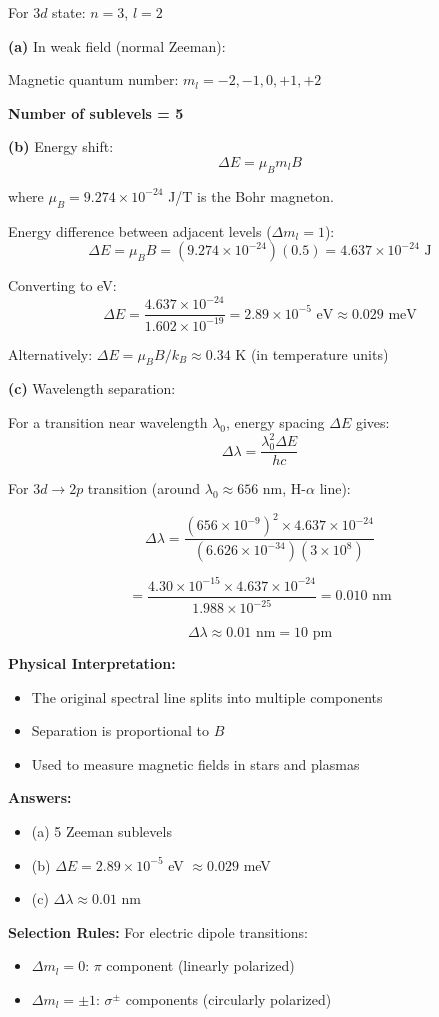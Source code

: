 \documentclass[12pt,a4paper]{article}
\begin{document}
\begin{solution}
For $3d$ state: $n = 3$, $l = 2$

\textbf{(a)} In weak field (normal Zeeman):

Magnetic quantum number: $m_l = -2, -1, 0, +1, +2$

\textbf{Number of sublevels = 5}

\textbf{(b)} Energy shift:
$$\Delta E = \mu_B m_l B$$

where $\mu_B = 9.274 \times 10^{-24}$ J/T is the Bohr magneton.

Energy difference between adjacent levels ($\Delta m_l = 1$):
$$\Delta E = \mu_B B = (9.274 \times 10^{-24})(0.5) = 4.637 \times 10^{-24}\text{ J}$$

Converting to eV:
$$\Delta E = \frac{4.637 \times 10^{-24}}{1.602 \times 10^{-19}} = 2.89 \times 10^{-5}\text{ eV} \approx 0.029\text{ meV}$$

Alternatively: $\Delta E = \mu_B B / k_B \approx 0.34$ K (in temperature units)

\textbf{(c)} Wavelength separation:

For a transition near wavelength $\lambda_0$, energy spacing $\Delta E$ gives:
$$\Delta\lambda = \frac{\lambda_0^2 \Delta E}{hc}$$

For $3d \to 2p$ transition (around $\lambda_0 \approx 656$ nm, H-$\alpha$ line):

$$\Delta\lambda = \frac{(656 \times 10^{-9})^2 \times 4.637 \times 10^{-24}}{(6.626 \times 10^{-34})(3 \times 10^8)}$$

$$= \frac{4.30 \times 10^{-15} \times 4.637 \times 10^{-24}}{1.988 \times 10^{-25}} = 0.010\text{ nm}$$

$$\Delta\lambda \approx 0.01\text{ nm} = 10\text{ pm}$$

\textbf{Physical Interpretation:}
\begin{itemize}
    \item The original spectral line splits into multiple components
    \item Separation is proportional to $B$
    \item Used to measure magnetic fields in stars and plasmas
\end{itemize}

\textbf{Answers:}
\begin{itemize}
    \item (a) 5 Zeeman sublevels
    \item (b) $\Delta E = 2.89 \times 10^{-5}$ eV $\approx 0.029$ meV
    \item (c) $\Delta\lambda \approx 0.01$ nm
\end{itemize}

\textbf{Selection Rules:} For electric dipole transitions:
\begin{itemize}
    \item $\Delta m_l = 0$: $\pi$ component (linearly polarized)
    \item $\Delta m_l = \pm 1$: $\sigma^{\pm}$ components (circularly polarized)
\end{itemize}
\end{solution}
\end{document}
